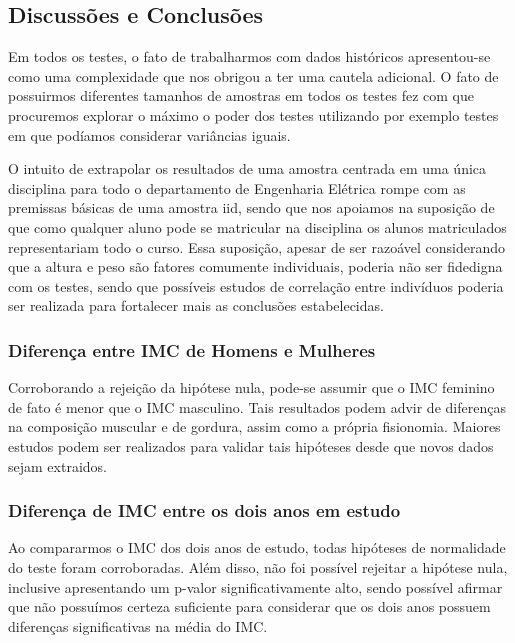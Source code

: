 \documentclass[
]{article}
\begin{document}
\subsection{Discussões e
Conclusões}\label{discussuxf5es-e-conclusuxf5es}

Em todos os testes, o fato de trabalharmos com dados históricos
apresentou-se como uma complexidade que nos obrigou a ter uma cautela
adicional. O fato de possuirmos diferentes tamanhos de amostras em todos
os testes fez com que procuremos explorar o máximo o poder dos testes
utilizando por exemplo testes em que podíamos considerar variâncias
iguais.

O intuito de extrapolar os resultados de uma amostra centrada em uma
única disciplina para todo o departamento de Engenharia Elétrica rompe
com as premissas básicas de uma amostra iid, sendo que nos apoiamos na
suposição de que como qualquer aluno pode se matricular na disciplina os
alunos matriculados representariam todo o curso. Essa suposição, apesar
de ser razoável considerando que a altura e peso são fatores comumente
individuais, poderia não ser fidedigna com os testes, sendo que
possíveis estudos de correlação entre indivíduos poderia ser realizada
para fortalecer mais as conclusões estabelecidas.

\subsubsection{Diferença entre IMC de Homens e
Mulheres}\label{diferenuxe7a-entre-imc-de-homens-e-mulheres-2}

Corroborando a rejeição da hipótese nula, pode-se assumir que o IMC
feminino de fato é menor que o IMC masculino. Tais resultados podem
advir de diferenças na composição muscular e de gordura, assim como a
própria fisionomia. Maiores estudos podem ser realizados para validar
tais hipóteses desde que novos dados sejam extraidos.

\subsubsection{Diferença de IMC entre os dois anos em
estudo}\label{diferenuxe7a-de-imc-entre-os-dois-anos-em-estudo-2}

Ao compararmos o IMC dos dois anos de estudo, todas hipóteses de
normalidade do teste foram corroboradas. Além disso, não foi possível
rejeitar a hipótese nula, inclusive apresentando um p-valor
significativamente alto, sendo possível afirmar que não possuímos
certeza suficiente para considerar que os dois anos possuem diferenças
significativas na média do IMC.
\end{document}
